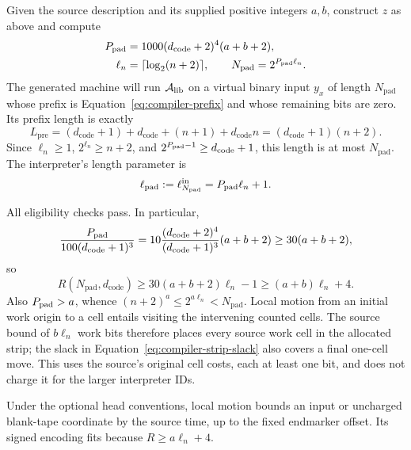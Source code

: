 Given the source description and its supplied positive integers $a,b$,
construct $z$ as above and compute
\begin{equation}\label{eq:compiler-padding}
 \begin{split}
 {P_{\rm pad}}&=1000(d_{\mathrm{code}}+2)^4(a+b+2),\\
 \ell_n&=\lceil\log_2(n+2)\rceil,
 \qquad N_{\mathrm{pad}}=2^{P_{\rm pad}\ell_n}.
 \end{split}
\end{equation}
The generated machine will run ${\mathcal A_{\rm lib}}$ on a virtual binary input
$y_x$ of length $N_{\mathrm{pad}}$ whose prefix is
Equation~\eqref{eq:compiler-prefix} and whose remaining bits are zero.
Its prefix length is exactly
\begin{equation}\label{eq:compiler-prefix-length}
 L_{\mathrm{pre}}
 =(d_{\mathrm{code}}+1)+d_{\mathrm{code}}+(n+1)
       +d_{\mathrm{code}}n
 =(d_{\mathrm{code}}+1)(n+2).
\end{equation}
Since $\ell_n\ge1$, $2^{\ell_n}\ge n+2$, and
$2^{{P_{\rm pad}}-1}\ge d_{\mathrm{code}}+1$, this length is at most
$N_{\mathrm{pad}}$.  The interpreter's length parameter is
\begin{equation}\label{eq:compiler-padded-log}
 \ell_{\mathrm{pad}}
 :=\ell_{N_{\mathrm{pad}}}^{\rm in}=P_{\rm pad}\ell_n+1.
\end{equation}

All eligibility checks pass.  In particular,
\[
 \frac{{P_{\rm pad}}}{100(d_{\mathrm{code}}+1)^3}
 =10\frac{(d_{\mathrm{code}}+2)^4}
          {(d_{\mathrm{code}}+1)^3}(a+b+2)
 \ge30(a+b+2),
\]
so
\begin{equation}\label{eq:compiler-strip-slack}
 R(N_{\mathrm{pad}},d_{\mathrm{code}})
 \ge30(a+b+2)\ell_n-1\ge(a+b)\ell_n+4.
\end{equation}
Also ${P_{\rm pad}}>a$, whence
$(n+2)^a\le2^{a\ell_n}<N_{\mathrm{pad}}$.
Local motion from an initial work origin to a cell entails visiting
the intervening counted cells.  The source bound of $b\ell_n$ work bits
therefore places every source work cell in the allocated strip;
the slack in Equation~\eqref{eq:compiler-strip-slack} also covers a final
one-cell move.  This uses the source's original cell costs, each at
least one bit, and does not charge it for the larger interpreter IDs.

Under the optional head conventions, local motion bounds an input or
uncharged blank-tape coordinate by the source time, up to the fixed
endmarker offset.  Its signed encoding fits because $R\ge a\ell_n+4$.

